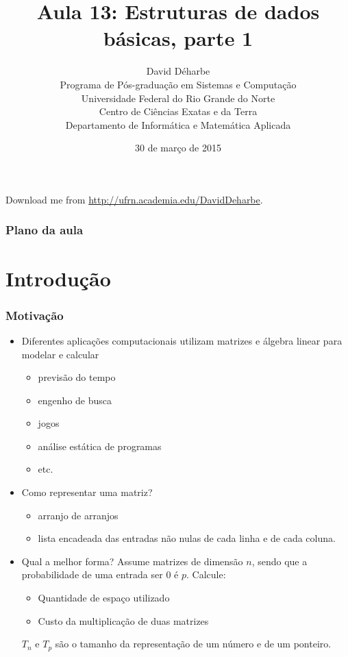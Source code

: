 \documentclass{beamer}
\title{Aula 13: Estruturas de dados básicas, parte 1}
\author{David Déharbe \\
  Programa de Pós-graduação em Sistemas e Computação \\
  Universidade Federal do Rio Grande do Norte \\
  Centro de Ciências Exatas e da Terra \\
  Departamento de Informática e Matemática Aplicada}
\date{30 de março de 2015}
\begin{document}
\begin{frame}
  \titlepage
  Download me from \url{http://ufrn.academia.edu/DavidDeharbe}.
\end{frame}

\begin{frame}
  \frametitle{Plano da aula}
  \tableofcontents
\end{frame}

\section{Introdução}

\begin{frame}
  \frametitle{Motivação}

  \begin{itemize}
  \item Diferentes aplicações computacionais utilizam
    matrizes e álgebra linear para modelar e calcular
    \begin{itemize}
      \item previsão do tempo
      \item engenho de busca
      \item jogos
      \item análise estática de programas
      \item etc.
    \end{itemize}
  \item Como representar uma matriz?
    \pause
    \begin{itemize}
      \item \alert{arranjo de arranjos}
      \item \alert{lista encadeada} das entradas não nulas de cada linha e de
        cada coluna.
    \end{itemize}
  \item Qual a melhor forma?
    \pause
    Assume matrizes de dimensão $n$, sendo que a probabilidade de uma 
    entrada ser 0 é $p$. Calcule:
    \begin{itemize}
      \item Quantidade de espaço utilizado
      \item Custo da multiplicação de duas matrizes
    \end{itemize}
    $T_n$ e $T_p$ são o tamanho da representação de um número e
    de um ponteiro.
  \end{itemize}

\end{frame}
\end{document}
